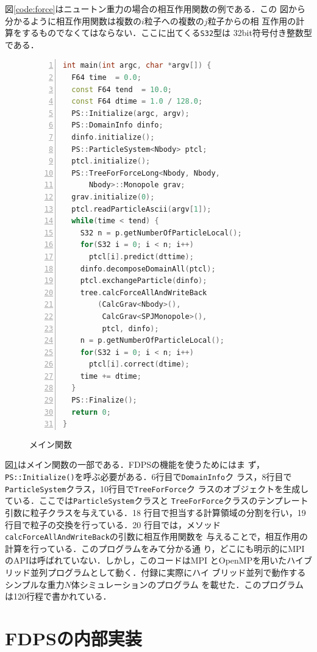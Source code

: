 \documentclass[submit,techreq,noauthor]{ipsj}
\begin{document}
図\ref{code:force}はニュートン重力の場合の相互作用関数の例である．この
図から分かるように相互作用関数は複数の$i$粒子への複数の$j$粒子からの相
互作用の計算をするものでなくてはならない．ここに出てくる{\tt S32}型は
32bit符号付き整数型である．

\begin{figure}[!h]
\begin{lstlisting}[language=c++,numbers=left,numbersep=5pt,frame=single,basicstyle=\ttfamily]
int main(int argc, char *argv[]) {
  F64 time  = 0.0;
  const F64 tend  = 10.0;
  const F64 dtime = 1.0 / 128.0;
  PS::Initialize(argc, argv);
  PS::DomainInfo dinfo;
  dinfo.initialize();
  PS::ParticleSystem<Nbody> ptcl;
  ptcl.initialize();
  PS::TreeForForceLong<Nbody, Nbody,
      Nbody>::Monopole grav;
  grav.initialize(0);
  ptcl.readParticleAscii(argv[1]);
  while(time < tend) {
    S32 n = p.getNumberOfParticleLocal();
    for(S32 i = 0; i < n; i++)
      ptcl[i].predict(dttime);
    dinfo.decomposeDomainAll(ptcl);
    ptcl.exchangeParticle(dinfo);    
    tree.calcForceAllAndWriteBack
        (CalcGrav<Nbody>(),
         CalcGrav<SPJMonopole>(),
         ptcl, dinfo);    
    n = p.getNumberOfParticleLocal();
    for(S32 i = 0; i < n; i++)
      ptcl[i].correct(dtime);                            
    time += dtime;
  }
  PS::Finalize();
  return 0;
}
\end{lstlisting}
\label{code:main}
\caption{メイン関数}
\end{figure}

図\ref{code:main}はメイン関数の一部である．FDPSの機能を使うためにはま
ず，{\tt PS::Initialize()}を呼ぶ必要がある．6行目で{\tt DomainInfo}ク
ラス，8行目で{\tt ParticleSystem}クラス，10行目で{\tt TreeForForce}ク
ラスのオブジェクトを生成している．ここでは{\tt ParticleSystem}クラスと
{\tt TreeForForce}クラスのテンプレート引数に粒子クラスを与えている．18
行目で担当する計算領域の分割を行い，19行目で粒子の交換を行っている．20
行目では，メソッド{\tt calcForceAllAndWriteBack}の引数に相互作用関数を
与えることで，相互作用の計算を行っている．このプログラムをみて分かる通
り，どこにも明示的にMPIのAPIは呼ばれていない．しかし，このコードはMPI
とOpenMPを用いたハイブリッド並列プログラムとして動く．付録に実際にハイ
ブリッド並列で動作するシンプルな重力$N$体シミュレーションのプログラム
を載せた．このプログラムは120行程で書かれている．

\section{FDPSの内部実装}
\end{document}
